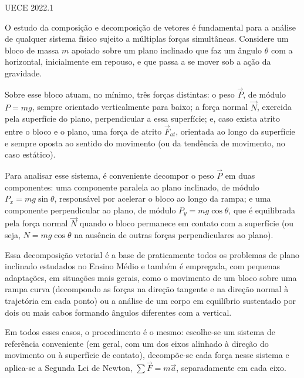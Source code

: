 \documentclass{beamer}
\begin{document}
\question
  {UECE 2022.1}
  {O estudo da composição e decomposição de vetores é fundamental para a
   análise de qualquer sistema físico sujeito a múltiplas forças
   simultâneas. Considere um bloco de massa $m$ apoiado sobre um plano
   inclinado que faz um ângulo $\theta$ com a horizontal, inicialmente em
   repouso, e que passa a se mover sob a ação da gravidade.

   Sobre esse bloco atuam, no mínimo, três forças distintas: o peso
   $\vec{P}$, de módulo $P = mg$, sempre orientado verticalmente para
   baixo; a força normal $\vec{N}$, exercida pela superfície do plano,
   perpendicular a essa superfície; e, caso exista atrito entre o bloco e
   o plano, uma força de atrito $\vec{F}_{at}$, orientada ao longo da
   superfície e sempre oposta ao sentido do movimento (ou da tendência de
   movimento, no caso estático).

   Para analisar esse sistema, é conveniente decompor o peso $\vec{P}$ em
   duas componentes: uma componente paralela ao plano inclinado, de
   módulo $P_x = mg\sin\theta$, responsável por acelerar o bloco ao longo
   da rampa; e uma componente perpendicular ao plano, de módulo
   $P_y = mg\cos\theta$, que é equilibrada pela força normal $\vec{N}$
   quando o bloco permanece em contato com a superfície (ou seja,
   $N = mg\cos\theta$ na ausência de outras forças perpendiculares ao
   plano).

   Essa decomposição vetorial é a base de praticamente todos os problemas
   de plano inclinado estudados no Ensino Médio e também é empregada, com
   pequenas adaptações, em situações mais gerais, como o movimento de um
   bloco sobre uma rampa curva (decompondo as forças na direção tangente
   e na direção normal à trajetória em cada ponto) ou a análise de um
   corpo em equilíbrio sustentado por dois ou mais cabos formando ângulos
   diferentes com a vertical.

   Em todos esses casos, o procedimento é o mesmo: escolhe-se um sistema
   de referência conveniente (em geral, com um dos eixos alinhado à
   direção do movimento ou à superfície de contato), decompõe-se cada
   força nesse sistema e aplica-se a Segunda Lei de Newton,
   $\sum \vec{F} = m\vec{a}$, separadamente em cada eixo.

}
\end{document}
